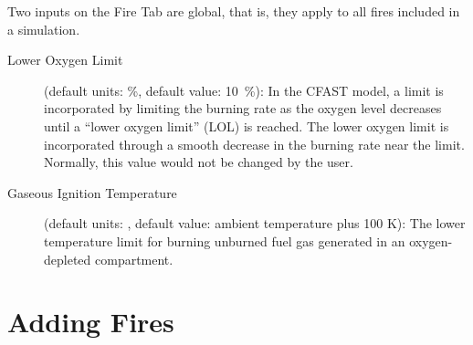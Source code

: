 Two inputs on the Fire Tab are global, that is, they apply to all fires included in a simulation.
\begin{description}
\item[Lower Oxygen Limit] (default units: \%, default value: 10~\%):  In the CFAST model, a limit is incorporated by limiting the burning rate as the oxygen level decreases until a ``lower oxygen limit'' (LOL) is reached. The lower oxygen limit is incorporated through a smooth decrease in the burning rate near the limit. Normally, this value would not be changed by the user.
\item[Gaseous Ignition Temperature] (default units: \degc, default value: ambient temperature plus 100 K): The lower temperature limit for burning unburned fuel gas generated in an oxygen-depleted compartment.
\end{description}

\section{Adding Fires}
\label{sec:fire_inputs}

